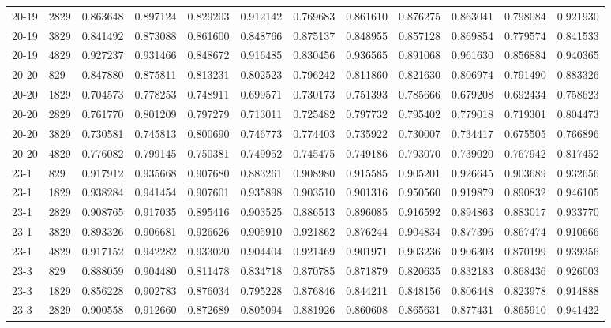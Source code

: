 \begin{longtable}{llrrrrrrrrrr}
20-19 & 2829 & 0.863648 & 0.897124 & 0.829203 & 0.912142 & 0.769683 & 0.861610 & 0.876275 & 0.863041 & 0.798084 & 0.921930\\
20-19 & 3829 & 0.841492 & 0.873088 & 0.861600 & 0.848766 & 0.875137 & 0.848955 & 0.857128 & 0.869854 & 0.779574 & 0.841533\\
20-19 & 4829 & 0.927237 & 0.931466 & 0.848672 & 0.916485 & 0.830456 & 0.936565 & 0.891068 & 0.961630 & 0.856884 & 0.940365\\
20-20 & 829 & 0.847880 & 0.875811 & 0.813231 & 0.802523 & 0.796242 & 0.811860 & 0.821630 & 0.806974 & 0.791490 & 0.883326\\
20-20 & 1829 & 0.704573 & 0.778253 & 0.748911 & 0.699571 & 0.730173 & 0.751393 & 0.785666 & 0.679208 & 0.692434 & 0.758623\\
20-20 & 2829 & 0.761770 & 0.801209 & 0.797279 & 0.713011 & 0.725482 & 0.797732 & 0.795402 & 0.779018 & 0.719301 & 0.804473\\
20-20 & 3829 & 0.730581 & 0.745813 & 0.800690 & 0.746773 & 0.774403 & 0.735922 & 0.730007 & 0.734417 & 0.675505 & 0.766896\\
20-20 & 4829 & 0.776082 & 0.799145 & 0.750381 & 0.749952 & 0.745475 & 0.749186 & 0.793070 & 0.739020 & 0.767942 & 0.817452\\
23-1 & 829 & 0.917912 & 0.935668 & 0.907680 & 0.883261 & 0.908980 & 0.915585 & 0.905201 & 0.926645 & 0.903689 & 0.932656\\
23-1 & 1829 & 0.938284 & 0.941454 & 0.907601 & 0.935898 & 0.903510 & 0.901316 & 0.950560 & 0.919879 & 0.890832 & 0.946105\\
23-1 & 2829 & 0.908765 & 0.917035 & 0.895416 & 0.903525 & 0.886513 & 0.896085 & 0.916592 & 0.894863 & 0.883017 & 0.933770\\
23-1 & 3829 & 0.893326 & 0.906681 & 0.926626 & 0.905910 & 0.921862 & 0.876244 & 0.904834 & 0.877396 & 0.867474 & 0.910666\\
23-1 & 4829 & 0.917152 & 0.942282 & 0.933020 & 0.904404 & 0.921469 & 0.901971 & 0.903236 & 0.906303 & 0.870199 & 0.939356\\
23-3 & 829 & 0.888059 & 0.904480 & 0.811478 & 0.834718 & 0.870785 & 0.871879 & 0.820635 & 0.832183 & 0.868436 & 0.926003\\
23-3 & 1829 & 0.856228 & 0.902783 & 0.876034 & 0.795228 & 0.876846 & 0.844211 & 0.848156 & 0.806448 & 0.823978 & 0.914888\\
23-3 & 2829 & 0.900558 & 0.912660 & 0.872689 & 0.805094 & 0.881926 & 0.860608 & 0.865631 & 0.877431 & 0.865910 & 0.941422\\

\end{longtable}

